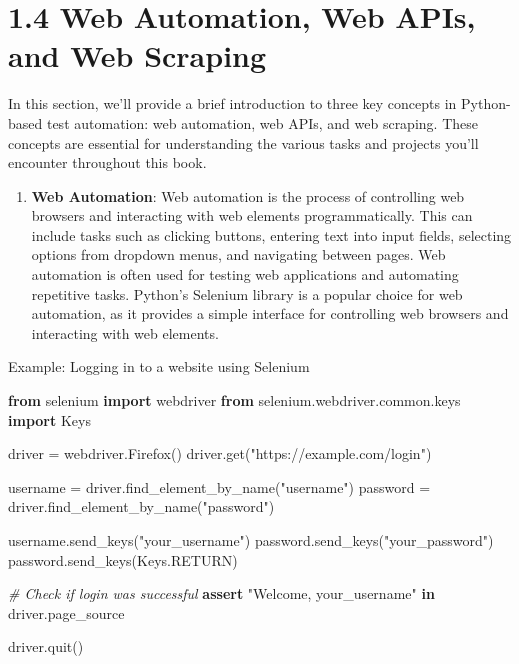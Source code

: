 \documentclass[
  paper=a4,
  ,captions=tableheading
]{scrartcl}
\newenvironment{Shaded}{}{}
\newcommand{\CommentTok}[1]{\textcolor[rgb]{0.38,0.63,0.69}{\textit{#1}}}
\newcommand{\ControlFlowTok}[1]{\textcolor[rgb]{0.00,0.44,0.13}{\textbf{#1}}}
\newcommand{\ImportTok}[1]{\textcolor[rgb]{0.00,0.50,0.00}{\textbf{#1}}}
\newcommand{\KeywordTok}[1]{\textcolor[rgb]{0.00,0.44,0.13}{\textbf{#1}}}
\newcommand{\NormalTok}[1]{#1}
\newcommand{\OperatorTok}[1]{\textcolor[rgb]{0.40,0.40,0.40}{#1}}
\newcommand{\StringTok}[1]{\textcolor[rgb]{0.25,0.44,0.63}{#1}}
\providecommand{\tightlist}{%
  \setlength{\itemsep}{0pt}\setlength{\parskip}{0pt}}
\begin{document}
\hypertarget{web-automation-web-apis-and-web-scraping}{%
\section{1.4 Web Automation, Web APIs, and Web
Scraping}\label{web-automation-web-apis-and-web-scraping}}

In this section, we'll provide a brief introduction to three key
concepts in Python-based test automation: web automation, web APIs, and
web scraping. These concepts are essential for understanding the various
tasks and projects you'll encounter throughout this book.

\begin{enumerate}
\def\labelenumi{\arabic{enumi}.}
\tightlist
\item
  \textbf{Web Automation}: Web automation is the process of controlling
  web browsers and interacting with web elements programmatically. This
  can include tasks such as clicking buttons, entering text into input
  fields, selecting options from dropdown menus, and navigating between
  pages. Web automation is often used for testing web applications and
  automating repetitive tasks. Python's Selenium library is a popular
  choice for web automation, as it provides a simple interface for
  controlling web browsers and interacting with web elements.
\end{enumerate}

Example: Logging in to a website using Selenium

\begin{Shaded}
\begin{Highlighting}[]

\ImportTok{from}\NormalTok{ selenium }\ImportTok{import}\NormalTok{ webdriver}
\ImportTok{from}\NormalTok{ selenium.webdriver.common.keys }\ImportTok{import}\NormalTok{ Keys}

\NormalTok{driver }\OperatorTok{=}\NormalTok{ webdriver.Firefox()}
\NormalTok{driver.get(}\StringTok{"https://example.com/login"}\NormalTok{)}

\NormalTok{username }\OperatorTok{=}\NormalTok{ driver.find\_element\_by\_name(}\StringTok{"username"}\NormalTok{)}
\NormalTok{password }\OperatorTok{=}\NormalTok{ driver.find\_element\_by\_name(}\StringTok{"password"}\NormalTok{)}

\NormalTok{username.send\_keys(}\StringTok{"your\_username"}\NormalTok{)}
\NormalTok{password.send\_keys(}\StringTok{"your\_password"}\NormalTok{)}
\NormalTok{password.send\_keys(Keys.RETURN)}

\CommentTok{\# Check if login was successful}
\ControlFlowTok{assert} \StringTok{"Welcome, your\_username"} \KeywordTok{in}\NormalTok{ driver.page\_source}

\NormalTok{driver.quit()}
\end{Highlighting}
\end{Shaded}
\end{document}
